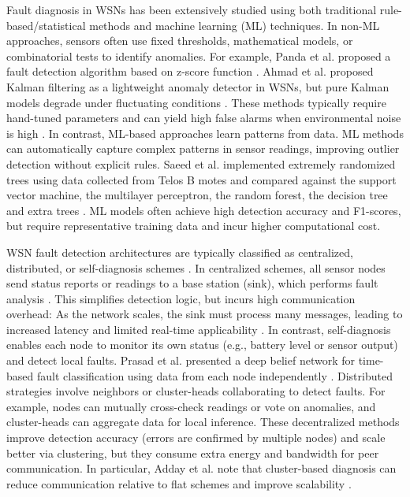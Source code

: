 Fault diagnosis in WSNs has been extensively studied using both traditional rule-based/statistical methods and machine learning (ML) techniques. In non-ML approaches, sensors often use fixed thresholds, mathematical models, or combinatorial tests to identify anomalies. For example, Panda et al. proposed a fault detection algorithm based on z-score function \cite{Panda2014}. Ahmad et al. proposed Kalman filtering as a lightweight anomaly detector in WSNs, but pure Kalman models degrade under fluctuating conditions \cite{Ahmad2024}. These methods typically require hand-tuned parameters and can yield high false alarms when environmental noise is high \cite{Muhammed2017, Zhang2018}. In contrast, ML-based approaches learn patterns from data. ML methods can automatically capture complex patterns in sensor readings, improving outlier detection without explicit rules. Saeed et al. implemented extremely randomized trees using data collected from Telos B motes and compared against the support vector machine, the multilayer perceptron, the random forest, the decision tree and extra trees \cite{Saeed2021}. ML models often achieve high detection accuracy and F1-scores, but require representative training data and incur higher computational cost.

WSN fault detection architectures are typically classified as centralized, distributed, or self-diagnosis schemes \cite{Takele2024, Prasad2023}. In centralized schemes, all sensor nodes send status reports or readings to a base station (sink), which performs fault analysis \cite{Panda2014}. This simplifies detection logic, but incurs high communication overhead: As the network scales, the sink must process many messages, leading to increased latency and limited real-time applicability \cite{Muhammed2017, Zhang2018}. In contrast, self-diagnosis enables each node to monitor its own status (e.g., battery level or sensor output) and detect local faults. Prasad et al. presented a deep belief network for time-based fault classification using data from each node independently \cite{Prasad2023}. Distributed strategies involve neighbors or cluster-heads collaborating to detect faults. For example, nodes can mutually cross-check readings or vote on anomalies, and cluster-heads can aggregate data for local inference. These decentralized methods improve detection accuracy (errors are confirmed by multiple nodes) and scale better via clustering, but they consume extra energy and bandwidth for peer communication. In particular, Adday et al. note that cluster-based diagnosis can reduce communication relative to flat schemes and improve scalability \cite{Adday2022}.

